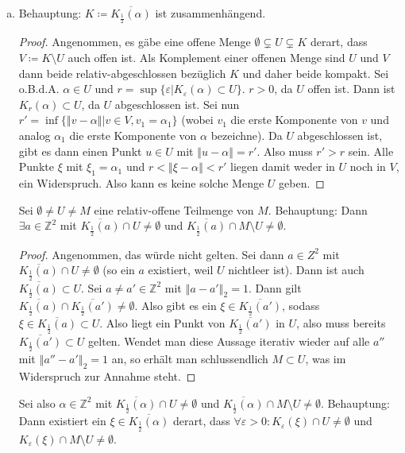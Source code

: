 \documentclass{article}
\theoremstyle{definition}
\newcommand{\Z}{\mathbb{Z}}
\newcommand{\norm}[1]{\left\Vert #1 \right\Vert}
\renewcommand{\epsilon}{\varepsilon}
\begin{document}
\begin{enumerate}[(a)]
	\item Behauptung: $K \coloneqq \overline{K_\frac{1}{2}(\alpha)}$ ist zusammenhängend.
	\begin{proof}
		Angenommen, es gäbe eine offene Menge $\emptyset \subsetneq U \subsetneq K$ derart, dass $V \coloneqq K\setminus U$ auch offen ist. Als Komplement einer offenen Menge sind $U$ und $V$ dann beide relativ-abgeschlossen bezüglich $K$ und daher beide kompakt. Sei o.B.d.A. $\alpha \in U$ und $r = \sup \{\epsilon | K_\epsilon(\alpha) \subset U\}$. $r > 0$, da $U$ offen ist. Dann ist $K_r(\alpha) \subset U$, da $U$ abgeschlossen ist. Sei nun $r' = \inf \{\norm{v - \alpha}|v\in V, v_1 = \alpha_1\}$ (wobei $v_1$ die erste Komponente von $v$ und analog $\alpha_1$ die erste Komponente von $\alpha$ bezeichne). Da $U$ abgeschlossen ist, gibt es dann einen Punkt $u \in U$ mit $\norm{u - \alpha} = r'$. Also muss $r' > r$ sein. Alle Punkte $\xi$ mit $\xi_1 = \alpha_1$ und $r < \norm{\xi - \alpha} < r'$ liegen damit weder in $U$ noch in $V$, ein Widerspruch. Also kann es keine solche Menge $U$ geben. 
	\end{proof}
	Sei $\emptyset \neq U \neq M$ eine relativ-offene Teilmenge von $M$. 
	Behauptung: Dann $\exists a \in \Z^2$ mit  $\overline{K_\frac{1}{2}(a)}\cap U \neq \emptyset$ und $\overline{K_\frac{1}{2}(a)}\cap M\setminus U \neq \emptyset$. 
	\begin{proof}
		Angenommen, das würde nicht gelten. Sei dann $a \in Z^2$ mit $\overline{K_\frac{1}{2}(a)} \cap U \neq \emptyset$ (so ein $a$ existiert, weil $U$ nichtleer ist). Dann ist auch $\overline{K_\frac{1}{2}(a)} \subset U$. Sei $a \neq a'\in \Z^2$ mit $\norm{a-a'}_2 = 1$. Dann gilt $\overline{K_\frac{1}{2}(a)}\cap \overline{K_\frac{1}{2}(a')} \neq \emptyset$. Also gibt es ein $\xi \in \overline{K_\frac{1}{2}(a')}$, sodass $\xi \in \overline{K_\frac{1}{2}(a)} \subset U$. Also liegt ein Punkt von $\overline{K_\frac{1}{2}(a')}$ in $U$, also muss bereits $\overline{K_\frac{1}{2}(a')}\subset U$ gelten. Wendet man diese Aussage iterativ wieder auf alle $a''$ mit $\norm{a''-a'}_2 = 1$ an, so erhält man schlussendlich $M \subset U$, was im Widerspruch zur Annahme steht. 
	\end{proof}
	Sei also $\alpha\in \Z^2$ mit   $\overline{K_\frac{1}{2}(\alpha)}\cap U \neq \emptyset$ und $\overline{K_\frac{1}{2}(\alpha)}\cap M\setminus U \neq \emptyset$. Behauptung: Dann existiert ein $\xi \in \overline{K_\frac{1}{2}(\alpha)}$ derart, dass $\forall \epsilon >0: K_\epsilon(\xi) \cap U \neq \emptyset$ und $K_\epsilon(\xi) \cap M\setminus U \neq \emptyset$. 

\end{enumerate}
\end{document}
